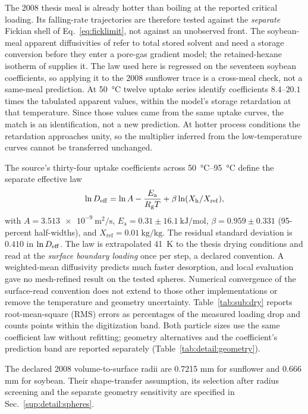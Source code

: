 \documentclass[11pt]{article}
\begin{document}
The 2008 thesis meal is already hotter than boiling at the reported critical loading. Its falling-rate trajectories are therefore tested against the \emph{separate} Fickian shell of Eq.~\eqref{eq:ficklimit}, not against an unobserved front. The soybean-meal apparent diffusivities of \citet{cardarelli1998thesis} refer to total stored solvent and need a storage conversion before they enter a pore-gas gradient model; the retained-hexane isotherm of \citet{cardarelli1996hexane} supplies it. The law used here is regressed on the seventeen soybean coefficients, so applying it to the 2008 sunflower trace is a cross-meal check, not a same-meal prediction. At \SI{50}{\celsius} twelve uptake series identify coefficients $8.4$--$20.1$ times the tabulated apparent values, within the model's storage retardation at that temperature. Since those values came from the same uptake curves, the match is an identification, not a new prediction. At hotter process conditions the retardation approaches unity, so the multiplier inferred from the low-temperature curves cannot be transferred unchanged.

The source's thirty-four uptake coefficients across \SIrange{50}{95}{\celsius}
define the separate effective law
\begin{equation}
\ln D_{\mathrm{eff}}=\ln A-\frac{E_{\mathrm a}}{R_{\mathrm g}T}
+\beta\ln(X_{\mathrm{h}}/X_{\mathrm{ref}}),\label{eq:sup:defflaw}
\end{equation}
with $A=\SI{3.513e-9}{\meter\squared\per\second}$,
$E_{\mathrm a}=0.31\pm\SI{16.1}{\kilo\joule\per\mole}$,
$\beta=0.959\pm0.331$ (95-percent half-widths), and
$X_{\mathrm{ref}}=\SI{0.01}{\kilogram\per\kilogram}$. The residual standard
deviation is $0.410$ in $\ln D_{\mathrm{eff}}$. The law is extrapolated
\SI{41}{\kelvin} to the thesis drying
conditions and read at the \emph{surface boundary loading} once per step, a
declared convention. A weighted-mean diffusivity \citep{crank1956diffusion}
predicts much faster desorption, and local evaluation gave no mesh-refined
result on the tested spheres. Numerical convergence of the surface-read
convention does not extend to those other implementations or remove the
temperature and geometry uncertainty. Table~\ref{tab:sub:dry} reports
root-mean-square (RMS) errors as percentages of the measured loading drop
and counts points within the digitization band. Both particle sizes use the
same coefficient law without refitting; geometry alternatives and the
coefficient's prediction band are reported separately
(Table~\ref{tab:detail:geometry}).

The declared 2008 volume-to-surface radii are 0.7215 mm for sunflower and
0.666 mm for soybean. Their shape-transfer assumption, its selection
after radius screening and the separate geometry sensitivity are
specified in Sec.~\ref{sup:detail:spheres}.
\end{document}
